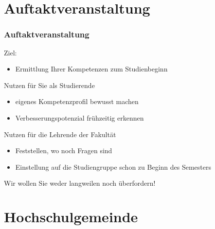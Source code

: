\documentclass{beamer}
\begin{document}
    \section{Auftaktveranstaltung}
    
    \begin{frame} 
    	\frametitle{Auftaktveranstaltung}
    	Ziel:
    	\begin{itemize}
    		\item Ermittlung Ihrer Kompetenzen zum Studienbeginn
    	\end{itemize}
    	\bigskip
    	Nutzen für Sie als Studierende
    	\begin{itemize}
    		\item eigenes Kompetenzprofil bewusst machen
    		\item Verbesserungspotenzial frühzeitig erkennen
        \end{itemize}
        \bigskip
        Nutzen für die Lehrende der Fakultät
        \begin{itemize}
        	\item Feststellen, wo noch Fragen sind
        	\item Einstellung auf die Studiengruppe schon zu Beginn des Semesters
        \end{itemize}
        Wir wollen Sie weder langweilen noch überfordern!
    \end{frame}
    
    \section{Hochschulgemeinde}
    
\end{document}

